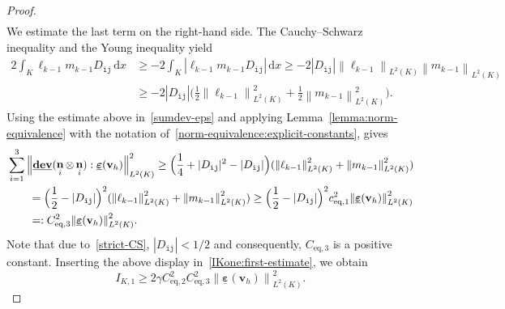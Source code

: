 \documentclass[10pt,a4paper]{amsart}
\newcommand{\Ceqthree}{C_{\text{eq},3}}
\newcommand{\Ceqtwo}{C_{\text{eq},2}}
\newcommand{\IKone}{I_{\K,1}}
\newcommand{\K}{K}
\newcommand{\Ltwo}{L^2}
\newcommand{\Norm}[1]{{\left\|{#1} \right\|}}
\newcommand{\ceqone}{c_{\text{eq},1}}
\DeclareMathOperator{\dev}{\underline{\mathbf{dev}}}
\newcommand{\dx}{\, \mathrm{d}x}
\newcommand{\epsbfun}{\underline{\boldsymbol{\varepsilon}}}
\newcommand{\itt}{\mathtt{i}}
\newcommand{\jtt}{\mathtt{j}}
\newcommand{\lkmo}{\ell_{k-1}}
\newcommand{\mkmo}{m_{k-1}}
\DeclareMathOperator{\norm}{\bf{n}}
\newcommand{\normi}{\norm_i}
\newcommand{\vbfh}{\mathbf{v}_h}
\begin{document}
\begin{proof}
\begin{equation}
\begin{split}
\end{split}
\end{equation}
We estimate the last term on the right-hand side.
The Cauchy--Schwarz inequality and
the Young inequality
yield
\begin{equation*}
\begin{split}
2\int_\K\lkmo\mkmo D_{\itt\jtt}\dx
&\geq - 2\int_\K|\lkmo\mkmo D_{\itt\jtt}|\dx 
\geq - 2|D_{\itt\jtt}|\Norm{\lkmo}_{\Ltwo(\K)}\Norm{\mkmo}_{\Ltwo(\K)} \\
&\geq - 2|D_{\itt\jtt}|\big(\frac12\Norm{\lkmo}^2_{\Ltwo(\K)} + \frac12\Norm{\mkmo}^2_{\Ltwo(\K)}\big).
\end{split}
\end{equation*}
Using the estimate above in~\eqref{sumdev-eps}
and applying Lemma~\ref{lemma:norm-equivalence}
with the notation of~\eqref{norm-equivalence:explicit-constants},
gives
\begin{equation*}
\begin{split}
&\sum_{i = 1}^3\Norm{\dev(\normi\otimes\normi):\epsbfun(\vbfh)}_{\Ltwo(\K)}^2 
\geq \Big(\frac14+|D_{\itt\jtt}|^2-|D_{\itt\jtt}|\Big)(\Norm{\lkmo}^2_{\Ltwo(\K)} + \Norm{\mkmo}^2_{\Ltwo(\K)}) \\
&\qquad= \Big(\frac12-|D_{\itt\jtt}|\Big)^2(\Norm{\lkmo}^2_{\Ltwo(\K)} + \Norm{\mkmo}^2_{\Ltwo(\K)})
\geq \Big(\frac12-|D_{\itt\jtt}|\Big)^2\ceqone^2\Norm{\epsbfun(\vbfh)}^2_{\Ltwo(\K)} \\
&\qquad=: \Ceqthree^2\Norm{\epsbfun(\vbfh)}^2_{\Ltwo(\K)}.
\end{split}
\end{equation*}
Note that due to~\eqref{strict-CS}, $|D_{\itt\jtt}|<1/2$ and
consequently, $\Ceqthree$ is a positive constant.
Inserting the above display in~\eqref{IKone:first-estimate},
we obtain
\begin{equation} \label{IKone}
\IKone \geq 2\gamma\Ceqtwo^2\Ceqthree^2\Norm{\epsbfun(\vbfh)}_{\Ltwo(\K)}^2.
\end{equation}


\end{proof}
\end{document}
